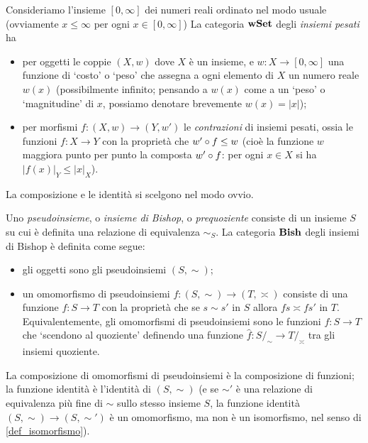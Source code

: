 \begin{example}\label{example_pesati}
	Consideriamo l'insieme \([0,\infty]\) dei numeri reali ordinato nel modo usuale (ovviamente \(x\le \infty\) per ogni \(x\in [0,\infty]\)) La categoria \(\mathbf{wSet}\) degli \emph{insiemi pesati} ha
	\begin{itemize}
		\item per oggetti le coppie \((X,w)\) dove \(X\) è un insieme, e \(w : X \to [0,\infty]\) una funzione di `costo' o `peso' che assegna a ogni elemento di \(X\) un numero reale \(w(x)\) (possibilmente infinito; pensando a \(w(x)\) come a un `peso' o `magnitudine' di \(x\), possiamo denotare brevemente \(w(x)=|x|\));
		\item per morfismi \(f : (X,w) \to (Y,w')\) le \emph{contrazioni} di insiemi pesati, ossia le funzioni \(f : X\to Y\) con la proprietà che \(w'\circ f \le w\) (cioè la funzione \(w\) maggiora punto per punto la composta \(w'\circ f\): per ogni \(x\in X\) si ha \(|f(x)|_Y \le |x|_X\)).
	\end{itemize}
	La composizione e le identità si scelgono nel modo ovvio.
\end{example}
\begin{example}\label{ex_cat_pseudoinsiemi}
	Uno \emph{pseudoinsieme}, o \emph{insieme di Bishop}, o \emph{prequoziente} consiste di un insieme \(S\) su cui è definita una relazione di equivalenza \(\sim_S\). La categoria \(\mathbf{Bish}\) degli insiemi di Bishop è definita come segue:
	\begin{itemize}
		\item gli oggetti sono gli pseudoinsiemi \((S,\sim)\);
		\item un omomorfismo di pseudoinsiemi \(f : (S,\sim) \to (T,\asymp)\) consiste di una funzione \(f : S\to T\) con la proprietà che se \(s\sim s'\) in \(S\) allora \(fs\asymp fs'\) in \(T\). Equivalentemente, gli omomorfismi di pseudoinsiemi sono le funzioni \(f : S\to T\) che `scendono al quoziente' definendo una funzione \(\hat f : S/_\sim \to T/_\asymp\) tra gli insiemi quoziente.
	\end{itemize}
	La composizione di omomorfismi di pseudoinsiemi è la composizione di funzioni; la funzione identità è l'identità di \((S,\sim)\) (e se \(\sim'\) è una relazione di equivalenza più fine di \(\sim\) sullo stesso insieme \(S\), la funzione identità \((S,\sim) \to (S,\sim')\) è un omomorfismo, ma non è un isomorfismo, nel senso di \ref{def_isomorfismo}).
\end{example}
